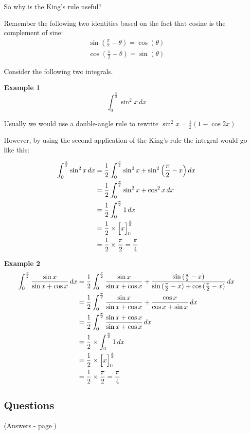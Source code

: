 \documentclass[../main.tex]{subfiles}
\begin{document}
So why is the King's rule useful? 

Remember the following two identities based on the fact that cosine is the complement of sine:
\begin{align*}
    \sin{(\frac{\pi}{2}-\theta)}=\cos{(\theta)}\\
    \cos{(\frac{\pi}{2}-\theta)}=\sin{(\theta)}
\end{align*}

Consider the following two integrals.

\textbf{Example 1}
\[\int_0^{\frac{\pi}{2}} \sin^2{x}\,dx\]

Usually we would use a double-angle rule to rewrite $\sin^2{x}=\frac{1}{2}(1-\cos{2x})$

However, by using the second application of the King's rule the integral would go like this:

\begin{align*}
    \int_0^{\frac{\pi}{2}} \sin^2{x}\,dx &= \frac{1}{2}\int_0^{\frac{\pi}{2}}\sin^2{x}+\sin^2{\Bigl(\frac{\pi}{2}-x\Bigr)}\,dx\\
    &= \frac{1}{2}\int_0^{\frac{\pi}{2}}\sin^2{x}+\cos^2{x}\,dx \\
    &=\frac{1}{2}\int_0^{\frac{\pi}{2}}1\,dx\\
    &=\frac{1}{2}\times \Bigl[x\Bigr]_0^{\frac{\pi}{2}}\\
    &=\frac{1}{2}\times \frac{\pi}{2}=\frac{\pi}{4}
\end{align*}

\textbf{Example 2}
\begin{align*}
    \int_0^{\frac{\pi}{2}} \frac{\sin{x}}{\sin{x}+\cos{x}}\,dx &= \frac{1}{2}\int_0^{\frac{\pi}{2}}\frac{\sin{x}}{\sin{x}+\cos{x}}+\frac{\sin{(\frac{\pi}{2}-x)}}{\sin{(\frac{\pi}{2}-x)}+\cos{(\frac{\pi}{2}-x)}}\,dx\\
    &=\frac{1}{2}\int_0^{\frac{\pi}{2}}\frac{\sin{x}}{\sin{x}+\cos{x}}+\frac{\cos{x}}{\cos{x}+\sin{x}}\,dx\\
    &=\frac{1}{2}\int_0^{\frac{\pi}{2}}\frac{\sin{x}+\cos{x}}{\sin{x}+\cos{x}}\,dx\\
    &=\frac{1}{2}\times \int_0^{\frac{\pi}{2}}1\,dx\\
    &=\frac{1}{2}\times \Bigl[x\Bigr]_0^{\frac{\pi}{2}}\\
    &=\frac{1}{2}\times \frac{\pi}{2}=\frac{\pi}{4}
\end{align*}

\pagebreak
\subsection*{Questions} 
\label{Kings rule}
(Answers - page {\pageref{Kings rule answers}})
\end{document}
